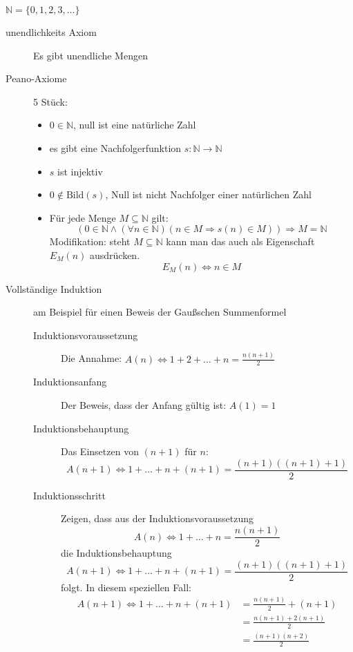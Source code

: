 $\mathbb{N} = \lbrace 0, 1, 2, 3, \dots \rbrace$
\begin{description}
    \item[unendlichkeits Axiom] Es gibt unendliche Mengen
    \item[Peano-Axiome] 5 Stück:
    \begin{itemize}
        \item $0 \in \mathbb{N}$, null ist eine natürliche Zahl
        \item es gibt eine Nachfolgerfunktion $s : \mathbb{N} \longrightarrow \mathbb{N}$
        \item $s$ ist injektiv
        \item $0 \not \in \textrm{Bild}(s)$, Null ist nicht Nachfolger einer natürlichen Zahl
        \item Für jede Menge $M \subseteq \mathbb{N}$ gilt:
        \[(0 \in \mathbb{N} \wedge (\forall n \in \mathbb{N})(n \in M \Rightarrow s(n) \in M)) \Rightarrow M = \mathbb{N}\]
        Modifikation: steht $M \subseteq \mathbb{N}$ kann man das auch als Eigenschaft $E_M(n)$ ausdrücken.
        \[E_M(n) \Leftrightarrow n \in M\]
    \end{itemize}
    \item[Vollständige Induktion] am Beispiel für einen Beweis der Gaußschen Summenformel
    \begin{description}
        \item[Induktionsvoraussetzung] Die Annahme: $A(n) \Leftrightarrow 1 + 2 + \dots + n = \frac{n(n+1)}{2}$
        \item[Induktionsanfang] Der Beweis, dass der Anfang gültig ist: $A(1) = 1$
        \item[Induktionsbehauptung] Das Einsetzen von $(n + 1)$ für $n$:
        \[A(n + 1) \Leftrightarrow 1 + \dots + n + (n + 1)= \frac{(n + 1)((n + 1)+1)}{2}\]
        \item[Induktionsschritt] Zeigen, dass aus der Induktionsvoraussetzung
        \[A(n) \Leftrightarrow 1 + \dots + n = \frac{n(n+1)}{2}\]
        die Induktionsbehauptung
        \[A(n + 1) \Leftrightarrow 1 + \dots + n + (n + 1) = \frac{(n + 1)((n + 1)+1)}{2}\]
        folgt. In diesem speziellen Fall:
        \begin{align*}
            A(n + 1) \Leftrightarrow 1 + \dots + n + (n + 1) & = \frac{n(n + 1)}{2} + (n + 1)  \\
            & = \frac{n(n + 1) + 2(n + 1)}{2} \\
            & = \frac{(n + 1)(n + 2)}{2}      \\

\end{align*}
\end{description}
\end{description}
